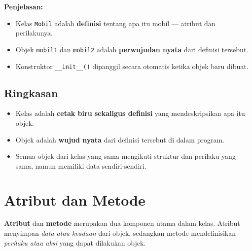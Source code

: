\noindent\textbf{Penjelasan:}
\begin{itemize}
    \item Kelas \texttt{Mobil} adalah \textbf{definisi} tentang apa itu mobil — atribut dan perilakunya.
    \item Objek \texttt{mobil1} dan \texttt{mobil2} adalah \textbf{perwujudan nyata} dari definisi tersebut.
    \item Konstruktor \texttt{\_\_init\_\_()} dipanggil secara otomatis ketika objek baru dibuat.
\end{itemize}

\begin{center}
\end{center}

\subsection*{Ringkasan}
\begin{itemize}
    \item Kelas adalah \textbf{cetak biru sekaligus definisi} yang mendeskripsikan apa itu objek.
    \item Objek adalah \textbf{wujud nyata} dari definisi tersebut di dalam program.
    \item Semua objek dari kelas yang sama mengikuti struktur dan perilaku yang sama, namun memiliki data sendiri-sendiri.
\end{itemize}


\section{Atribut dan Metode}

\textbf{Atribut} dan \textbf{metode} merupakan dua komponen utama dalam kelas.  
Atribut menyimpan \emph{data atau keadaan} dari objek, sedangkan metode mendefinisikan \emph{perilaku atau aksi} yang dapat dilakukan objek.

